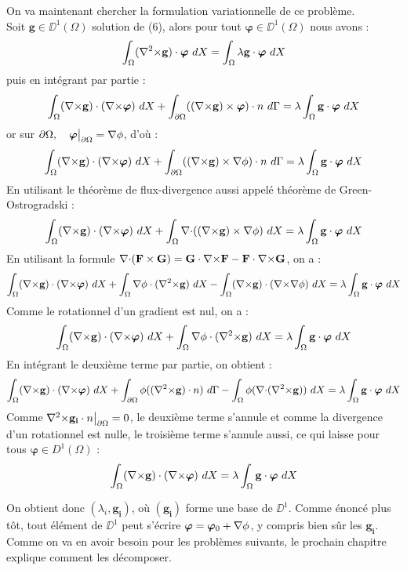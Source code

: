 On va maintenant chercher la formulation variationnelle de ce problème.\\
Soit $\mathbf{g}\in \DD^1(\Omega)$ solution de (6), alors pour tout $\bm{\varphi}\in \DD^1(\Omega)$ nous avons :
\[
\int_\Omega ({\nabla^2\times} \mathbf{g})\cdot\bm{\varphi}\ dX = \int_\Omega\lambda \mathbf{g}\cdot\bm{\varphi}\ dX
\]
puis en intégrant par partie :
\[
\int_\Omega ({\nabla\times} \mathbf{g})\cdot({\nabla\times}\bm{\varphi})\ dX + \int_{\partial\Omega} (({\nabla\times} \mathbf{g})\times \bm{\varphi})\cdot n\ d\Gamma = \lambda\int_\Omega \mathbf{g}\cdot\bm{\varphi}\ dX
\]
or sur $\partial\Omega,\quad \bm{\varphi}{\big\rvert_{\partial\Omega}}={\nabla}\phi$, d'où :
\[
\int_\Omega ({\nabla\times} \mathbf{g})\cdot({\nabla\times}\bm{\varphi})\ dX + \int_{\partial\Omega} (({\nabla\times} \mathbf{g})\times {\nabla}\phi)\cdot n\ d\Gamma = \lambda\int_\Omega \mathbf{g}\cdot\bm{\varphi}\ dX
\]
En utilisant le théorème de flux-divergence aussi appelé théorème de Green-Ostrogradski :
\[
\int_\Omega ({\nabla\times} \mathbf{g})\cdot({\nabla\times}\bm{\varphi})\ dX + \int_\Omega {\nabla\cdot}(({\nabla\times} \mathbf{g})\times {\nabla}\phi)\ dX = \lambda\int_\Omega \mathbf{g}\cdot\bm{\varphi}\ dX
\]
En utilisant la formule ${\nabla\cdot}(\mathbf{F}\times \mathbf{G}) = \mathbf{G}\cdot {\nabla\times} \mathbf{F} - \mathbf{F}\cdot {\nabla\times} \mathbf{G}$, on a :
\[
\int_\Omega (\rot \mathbf{g})\cdot(\rot\bm{\varphi})\ dX + \int_\Omega \grad\phi\cdot(\rott \mathbf{g})\ dX -\int_\Omega (\rot \mathbf{g})\cdot (\rot\grad\phi)\ dX  = \lambda\int_\Omega \mathbf{g}\cdot\bm{\varphi}\ dX
\]
Comme le rotationnel d'un gradient est nul, on a :
\[
\int_\Omega ({\nabla\times} \mathbf{g})\cdot({\nabla\times}\bm{\varphi})\ dX + \int_\Omega {\nabla}\phi\cdot({\nabla^2\times} \mathbf{g})\ dX  = \lambda\int_\Omega \mathbf{g}\cdot\bm{\varphi}\ dX
\]
En intégrant le deuxième terme par partie, on obtient :
\[
\int_\Omega ({\nabla\times} \mathbf{g})\cdot({\nabla\times}\bm{\varphi})\ dX + \int_{\partial\Omega} \phi(({\nabla^2\times} \mathbf{g})\cdot n)\ d\Gamma - \int_\Omega \phi({\nabla\cdot}({\nabla^2\times} \mathbf{g}))\ dX  = \lambda\int_\Omega \mathbf{g}\cdot\bm{\varphi}\ dX
\]
Comme ${\nabla^2\times}  \mathbf{g_i}\cdot n{\big\rvert_{\partial\Omega}} = 0$, le deuxième terme s'annule et comme la divergence d'un rotationnel est nulle, le troisième terme s'annule aussi, ce qui laisse pour tous $\bm{\varphi}\in D^1(\Omega)$ :
\begin{equation}
\label{fveigen}
\int_\Omega ({\nabla\times} \mathbf{g})\cdot({\nabla\times}\bm{\varphi})\ dX = \lambda\int_\Omega \mathbf{g}\cdot\bm{\varphi}\ dX
\end{equation}

On obtient donc $(\lambda_i,\mathbf{g_i})$, où $(\mathbf{g_i})$ forme une base de $\DD^1$. Comme énoncé plus tôt, tout élément de $\DD^1$ peut s'écrire $\bm{\varphi} = \bm{\varphi}_0 + {\nabla}\phi$, y compris bien sûr les $\mathbf{g_i}$. Comme on va en avoir besoin pour les problèmes suivants, le prochain chapitre explique comment les décomposer.

